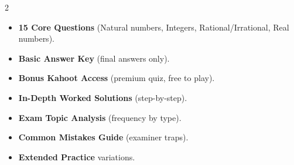 \documentclass[11pt,a4paper]{article}
\newcommand{\FullReleaseDate}{April 30, 2026}
\begin{document}
\vspace{8pt}

\begin{multicols}{2}
  \begin{tcolorbox}[card, title=\sffamily\bfseries\textcolor{white}{\faHandPointDown\ TODAY (Simplified Version)}, colbacktitle=mainblue, boxed title style={sharp corners, boxrule=0pt}]
    \begin{itemize}[leftmargin=1.2em, itemsep=2pt]
      \item \small \textbf{15 Core Questions} (Natural numbers, Integers, Rational/Irrational, Real numbers).
      \item \small \textbf{Basic Answer Key} (final answers only).
      \item \small \textbf{Bonus Kahoot Access} (premium quiz, free to play).
    \end{itemize}
  \end{tcolorbox}

  \columnbreak

  \begin{tcolorbox}[card, title=\sffamily\bfseries\textcolor{white}{\faRocket\ ON \FullReleaseDate\ (Full Upgrade)}, colbacktitle=mainblue, boxed title style={sharp corners, boxrule=0pt}]
    \begin{itemize}[leftmargin=1.2em, itemsep=2pt]
      \item \small \textbf{In-Depth Worked Solutions} (step-by-step).
      \item \small \textbf{Exam Topic Analysis} (frequency by type).
      \item \small \textbf{Common Mistakes Guide} (examiner traps).
      \item \small \textbf{Extended Practice} variations.
    \end{itemize}
  \end{tcolorbox}
\end{multicols}
\end{document}
